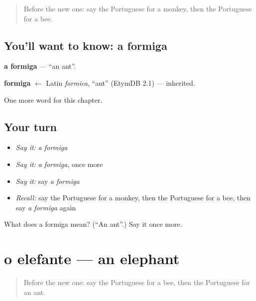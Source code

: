 \label{lesson:PT-C63-formiga}



\begin{quote}
Before the new one: say the Portuguese for a monkey, then the Portuguese for a bee.
\end{quote}

\subsection*{You'll want to know: a formiga}
\textbf{a formiga} — \textquotedblleft{}an ant\textquotedblright{}.

\begin{cousinweb}
\textbf{formiga} $\leftarrow$ Latin \emph{formica}, \textquotedblleft{}ant\textquotedblright{} (EtymDB 2.1) — inherited.
\end{cousinweb}

\begin{grammarlens}[title={What you've built}]
One more word for this chapter.
\end{grammarlens}

\subsection*{Your turn}
\begin{itemize}
\raggedright
  \item \emph{Say it:} \emph{a formiga}
  \item \emph{Say it:} \emph{a formiga}, once more
  \item \emph{Say it:} say \emph{a formiga}
  \item \emph{Recall:} say the Portuguese for a monkey, then the Portuguese for a bee, then say \emph{a formiga} again
\end{itemize}

\begin{tcolorbox}[breakable,colback=teal!4,colframe=teal!35!black,title={Before you move on}]
What does a formiga mean? (\textquotedblleft{}An ant\textquotedblright{}.) Say it once more.
\end{tcolorbox}
\section[o elefante]{o elefante — an elephant}

\label{lesson:PT-C63-elefante}



\begin{quote}
Before the new one: say the Portuguese for a bee, then the Portuguese for an ant.
\end{quote}

